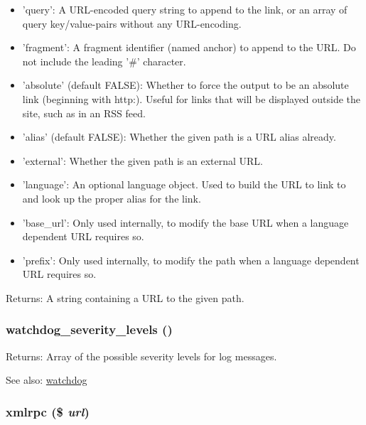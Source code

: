 \begin{Desc}
\begin{description}
\begin{itemize}
\item 'query': A URL-encoded query string to append to the link, or an array of query key/value-pairs without any URL-encoding.\item 'fragment': A fragment identifier (named anchor) to append to the URL. Do not include the leading '\#' character.\item 'absolute' (default FALSE): Whether to force the output to be an absolute link (beginning with http:). Useful for links that will be displayed outside the site, such as in an RSS feed.\item 'alias' (default FALSE): Whether the given path is a URL alias already.\item 'external': Whether the given path is an external URL.\item 'language': An optional language object. Used to build the URL to link to and look up the proper alias for the link.\item 'base\_\-url': Only used internally, to modify the base URL when a language dependent URL requires so.\item 'prefix': Only used internally, to modify the path when a language dependent URL requires so.\end{itemize}
\end{description}
\end{Desc}
\begin{Desc}
\item[Returns:]A string containing a URL to the given path. \end{Desc}
\hypertarget{common_8inc_fb5d4b58ec7e483153644c0f664e0ca4}{
\subsubsection[{watchdog\_\-severity\_\-levels}]{\setlength{\rightskip}{0pt plus 5cm}watchdog\_\-severity\_\-levels ()}}
\label{common_8inc_fb5d4b58ec7e483153644c0f664e0ca4}


\begin{Desc}
\item[Returns:]Array of the possible severity levels for log messages.\end{Desc}
\begin{Desc}
\item[See also:]\hyperlink{bootstrap_8inc_cb7338e6740302727043d64e3ae1257b}{watchdog} \end{Desc}
\hypertarget{common_8inc_2bbed4b1646f9ddc309a752e451a86b2}{
\subsubsection[{xmlrpc}]{\setlength{\rightskip}{0pt plus 5cm}xmlrpc (\$ {\em url})}}
\label{common_8inc_2bbed4b1646f9ddc309a752e451a86b2}


